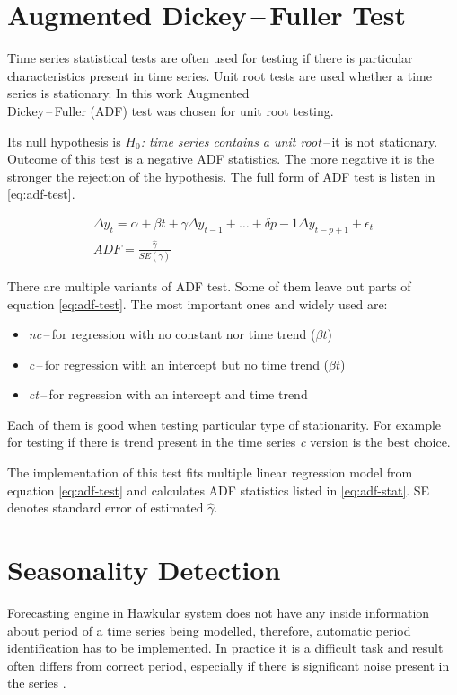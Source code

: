     \section{Augmented Dickey\,--\,Fuller Test} \label{sec:adf}
    Time series statistical tests are often used for testing if there is particular characteristics present in time
    series. Unit root tests are used whether a time series is stationary. In this work Augmented \\Dickey\,--\,Fuller
    (ADF) test was chosen for unit root testing.

    Its null hypothesis is \emph{$H_0$: time series contains a unit root}\,--\,it is not stationary. Outcome of this
    test
    is a negative ADF statistics. The more negative it is the stronger the rejection of the hypothesis.
    The full form of ADF test is listen in \ref{eq:adf-test}.

    \begin{gather} \label{eq:adf-test}
        \Delta y_t = \alpha + \beta t + \gamma \Delta y_{t-1} + \dots + \delta{p-1} \Delta y_{t-p+1} + \epsilon_t \\
        ADF = \frac{\hat{\gamma}}{SE(\hat{\gamma})} \label{eq:adf-stat}
    \end{gather}

    There are multiple variants of ADF test. Some of them leave out parts of equation \ref{eq:adf-test}. The most
    important ones and widely used are:

    \begin{itemize}
        \item \emph{nc}\,--\,for regression with no constant nor time trend ($\beta t$)
        \item \emph{c}\,--\,for regression with an intercept but no time trend ($\beta t$)
        \item \emph{ct}\,--\,for regression with an intercept and time trend
    \end{itemize}

    Each of them is good when testing particular type of stationarity. For example for testing if there is trend
    present in the time series \emph{c} version is the best choice.

    The implementation of this test fits multiple linear regression model from equation \ref{eq:adf-test} and
    calculates ADF statistics listed in \ref{eq:adf-stat}. SE denotes standard error of estimated $\hat{\gamma}$.

    \section{Seasonality Detection} \label{sec:period-detection}
    Forecasting engine in Hawkular system does not have any inside information about period of a time series being
    modelled, therefore, automatic period identification has to be implemented. In practice it is a difficult task and
    result often differs from correct period, especially if there is significant noise present in the series
    \cite{period-meteo}.

